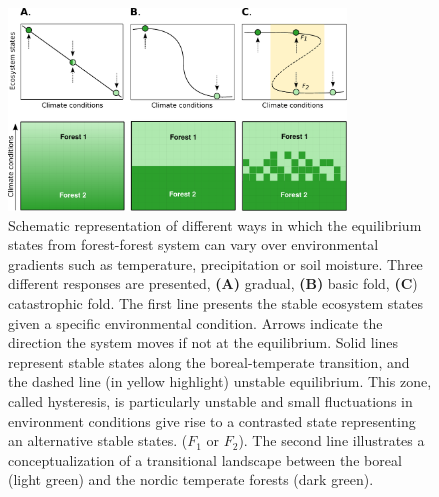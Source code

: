\begin{figure}[t]
\begin{center}
\includegraphics[width=0.8\textwidth]{fig/states.pdf}
\end{center}
\caption{Schematic representation of different ways in which the equilibrium
states from forest-forest system can vary over environmental gradients such as temperature, precipitation
or soil moisture. Three different responses are presented,
\textbf{(A)} gradual, \textbf{(B)} basic fold, \textbf{(C}) catastrophic fold.
The first line presents the stable ecosystem states
given a specific environmental condition. Arrows indicate the
direction the system moves if not at the equilibrium.
Solid lines represent stable states along the boreal-temperate
transition, and the dashed line (in yellow highlight) unstable equilibrium. This zone,
called hysteresis, is particularly unstable and small fluctuations in
environment conditions give rise to a contrasted state representing an
alternative stable states. ($F_1$ or $F_2$).
The second line illustrates a conceptualization of a transitional landscape
between the boreal (light green) and the nordic temperate forests (dark
green).}
\label{fig1}
\vspace{-1.25em}
\end{figure}


